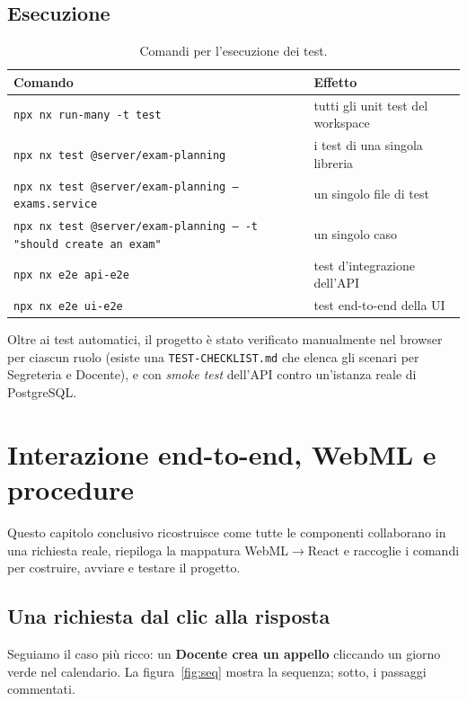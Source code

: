 \documentclass[11pt,a4paper,oneside]{report}
\newcommand{\code}[1]{\texttt{\small #1}}
\newcommand{\file}[1]{\texttt{\small #1}}
\begin{document}
\section{Esecuzione}
\begin{table}[h]
\centering
\small
\renewcommand{\arraystretch}{1.2}
\begin{tabularx}{\linewidth}{@{}lX@{}}
\toprule
\textbf{Comando} & \textbf{Effetto} \\
\midrule
\code{npx nx run-many -t test}        & tutti gli unit test del workspace \\
\code{npx nx test @server/exam-planning} & i test di una singola libreria \\
\code{npx nx test @server/exam-planning -- exams.service} & un singolo file di test \\
\code{npx nx test @server/exam-planning -- -t "should create an exam"} & un singolo caso \\
\code{npx nx e2e api-e2e}             & test d'integrazione dell'API \\
\code{npx nx e2e ui-e2e}              & test end-to-end della UI \\
\bottomrule
\end{tabularx}
\caption{Comandi per l'esecuzione dei test.}
\end{table}

Oltre ai test automatici, il progetto è stato verificato manualmente nel browser
per ciascun ruolo (esiste una \file{TEST-CHECKLIST.md} che elenca gli scenari per
Segreteria e Docente), e con \emph{smoke test} dell'API contro un'istanza reale
di PostgreSQL.

\chapter{Interazione end-to-end, WebML e procedure}
\label{cap:end2end}

Questo capitolo conclusivo ricostruisce come tutte le componenti collaborano in
una richiesta reale, riepiloga la mappatura WebML$\rightarrow$React e raccoglie i
comandi per costruire, avviare e testare il progetto.

\section{Una richiesta dal clic alla risposta}
Seguiamo il caso più ricco: un \textbf{Docente crea un appello} cliccando un
giorno verde nel calendario. La figura~\ref{fig:seq} mostra la sequenza; sotto, i
passaggi commentati.
\end{document}
